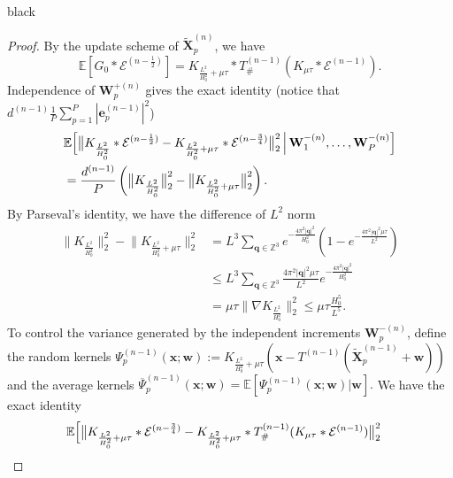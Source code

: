 \documentclass[review,onefignum,onetabnum]{siamart250211}
\begin{document}
\begin{color}{black}
\begin{proof}
By the update scheme of \(\widetilde{\mathbf{X}}_p^{(n)}\), we have
\begin{equation}
\mathbb{E}\left[G_0 \ast \mathcal{E}^{(n-\frac{1}{2})}\right] = K_{\frac{L^2}{H_0^2}+\mu \tau} \ast T_\#^{(n-1)}(K_{\mu \tau} \ast \mathcal{E}^{(n-1)} ).
\end{equation}
Independence of $\mathbf{W}_p^{+(n)}$ gives the exact identity (notice that $d^{(n-1)}\frac{1}{P}\sum_{p=1}^P |\mathbf{e}_p^{(n-1)}|^2$)
\begin{equation}\label{eq:post-variance-exact}
\begin{aligned}
&\mathbb{E}\Bigl[
  \bigl\|K_{\frac{L^2}{H_0^2}} * \mathcal{E}^{(n-\frac{1}{2})} - K_{\frac{L^2}{H_0^2}+\mu\tau} * \mathcal{E}^{(n-\frac{3}{4})}\bigr\|_2^2
  \,\Big|\,
  \mathbf{W}_1^{-(n)},
  \ldots,
  \mathbf{W}_P^{-(n)}
\Bigr]\\
&=
\frac{d^{(n-1)}}{P}
\left(
\bigl\|K_{\frac{L^2}{H_0^2}}\bigr\|_2^2
-
\bigl\|K_{\frac{L^2}{H_0^2}+\mu \tau}\bigr\|_2^2
\right).
\end{aligned}
\end{equation}
By Parseval's identity, we have the difference of $L^2$ norm
\begin{equation}
\begin{aligned}
\bigl\|K_{\frac{L^2}{H_0^2}}\bigr\|_2^2
-
\bigl\|K_{\frac{L^2}{H_0^2}+\mu \tau}\bigr\|_2^2 &= L^3 \sum_{\mathbf{q} \in \mathbb{Z}^3}e^{-\frac{4\pi^2|\mathbf{q}|^2}{H_0^2}}\left(1-e^{-\frac{4\pi^2|\mathbf{q}|^2 \mu \tau}{L^2}}\right)\\
&\leq L^3 \sum_{\mathbf{q} \in \mathbb{Z}^3} \frac{4\pi^2|\mathbf{q}|^2 \mu \tau}{L^2}e^{-\frac{4\pi^2|\mathbf{q}|^2}{H_0^2}}\\
&=\mu \tau \bigl\|\nabla K_{\frac{L^2}{H_0^2}}\bigr\|_2^2 \leq \mu \tau \frac{H_0^5}{L^5}.
\end{aligned}
\end{equation}
To control the variance generated by the independent increments $\mathbf{W}_p^{-(n)}$, define the
random kernels $\Psi_p^{(n-1)}(\mathbf{x};\mathbf{w}):=K_{\frac{L^2}{H_0^2}+\mu \tau}(\mathbf{x}-T^{(n-1)}(\widetilde{\mathbf{X}}_p^{(n-1)}+\mathbf{w}))$ and the average kernels $\overline{\Psi}_p^{(n-1)}(\mathbf{x};\mathbf{w})=\mathbb{E}\left[\Psi_p^{(n-1)}(\mathbf{x};\mathbf{w})\big|\mathbf{w}\right].$ We have the exact identity
\begin{equation}
\begin{aligned}
&\mathbb{E}\Bigl[\bigl\|
  K_{\frac{L^2}{H_0^2}+\mu\tau} * \mathcal{E}^{(n-\frac{3}{4})}-K_{\frac{L^2}{H_0^2}+\mu \tau} \ast T_\#^{(n-1)}(K_{\mu \tau} \ast \mathcal{E}^{(n-1)})\bigr\|_2^2

\end{aligned}
\end{equation}
\end{proof}
\end{color}
\end{document}
